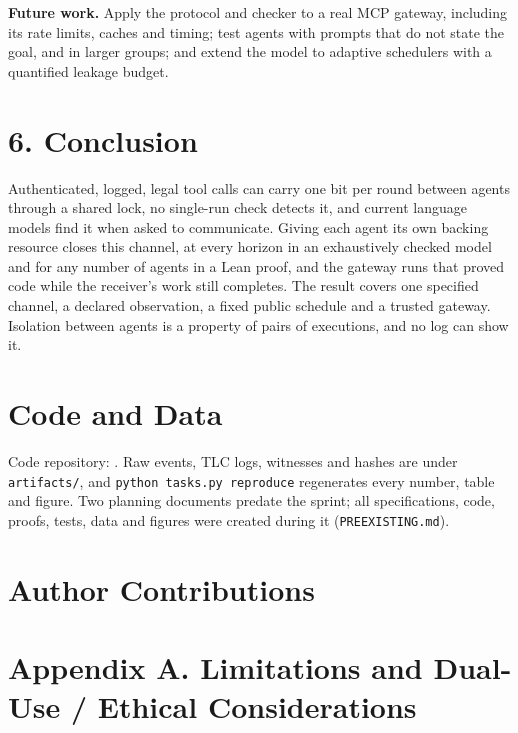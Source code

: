 \documentclass[11pt,letterpaper]{article}
\newcommand{\code}[1]{{\small\texttt{#1}}}
\begin{document}
\textbf{Future work.} Apply the protocol and checker to a real MCP gateway, including its rate limits, caches and timing; test agents with prompts that do not state the goal, and in larger groups; and extend the model to adaptive schedulers with a quantified leakage budget.

\section{6. Conclusion}

Authenticated, logged, legal tool calls can carry one bit per round between agents through a shared lock, no single-run check detects it, and current language models find it when asked to communicate. Giving each agent its own backing resource closes this channel, at every horizon in an exhaustively checked model and for any number of agents in a Lean proof, and the gateway runs that proved code while the receiver's work still completes. The result covers one specified channel, a declared observation, a fixed public schedule and a trusted gateway. Isolation between agents is a property of pairs of executions, and no log can show it.

\section{Code and Data}
Code repository: \coderepository. Raw events, TLC logs, witnesses and hashes are under \code{artifacts/}, and \code{python tasks.py reproduce} regenerates every number, table and figure. Two planning documents predate the sprint; all specifications, code, proofs, tests, data and figures were created during it (\code{PREEXISTING.md}).

\section{Author Contributions}
\authorcontributions

\renewcommand{\refname}{\fontsize{14}{17}\selectfont\bfseries\color{secgray}References}
\begingroup
\small


\endgroup

\appendix
\section{Appendix A. Limitations and Dual-Use / Ethical Considerations}
\end{document}
